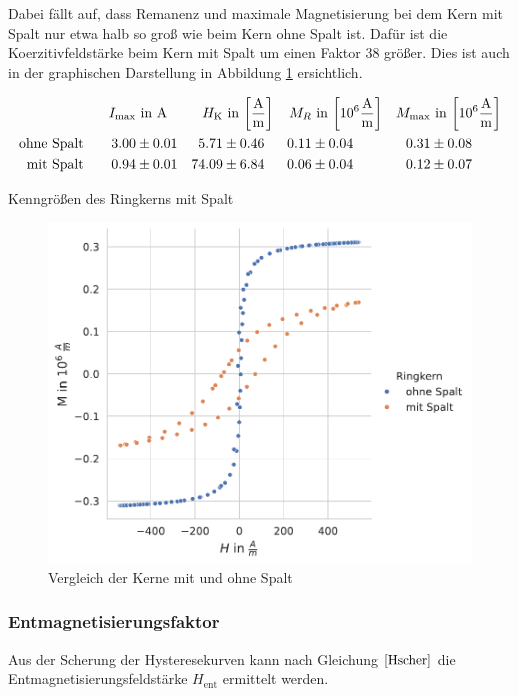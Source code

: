 \documentclass[12pt,a4paper]{scrartcl}
\numberwithin{equation}{section} %
\begin{document}
Dabei fällt auf, dass Remanenz und maximale Magnetisierung bei dem Kern mit Spalt nur etwa halb so groß wie beim Kern ohne Spalt ist. Dafür ist die Koerzitivfeldstärke beim Kern mit Spalt um einen Faktor $38$ größer. Dies ist auch in der graphischen Darstellung in Abbildung \ref{Abb: Vergleich} ersichtlich.

\begin{table}
\begin{align*}
	I_\mathrm{max} &\text{ in } \mathrm A &
		H_\mathrm{K} &\text{ in }
			{\tiny \left[ \frac{\mathrm A}{\mathrm m} \right] } &
		M_R &\text{ in }
		{\tiny \left[10^6 \frac{\mathrm A}{\mathrm m} \right] } &
		M_\mathrm{max} &\text{ in }
		{\tiny \left[10^6 \frac{\mathrm A}{\mathrm m} \right] }
		\\
	\text{ohne Spalt}\qquad
		3.00 &\pm 0.01 &
		5.71 &\pm 0.46 &
		0.11 &\pm 0.04 &
		0.31 &\pm 0.08
		\\
	\text{mit Spalt}\qquad
		0.94 &\pm 0.01 &
		74.09 &\pm 6.84 &
		0.06 &\pm 0.04 &
		0.12 &\pm 0.07
\end{align*}
\caption{Kenngrößen des Ringkerns mit Spalt}
\label{Tab: kenngr Spalt}
\end{table}

\begin{figure}[ht]
\centering
\includegraphics[scale=0.7]{../media/B2.4/3.3.3_comparison.pdf}
\caption{Vergleich der Kerne mit und ohne Spalt}
\label{Abb: Vergleich}
\end{figure}

\hypertarget{entmagnetisierungsfaktor-2}{%
\subsubsection{Entmagnetisierungsfaktor}\label{entmagnetisierungsfaktor-2}}
Aus der Scherung der Hysteresekurven kann nach Gleichung $\eqref{Hscher}$ die Entmagnetisierungsfeldstärke $H_\mathrm{ent}$ ermittelt werden.
\end{document}
